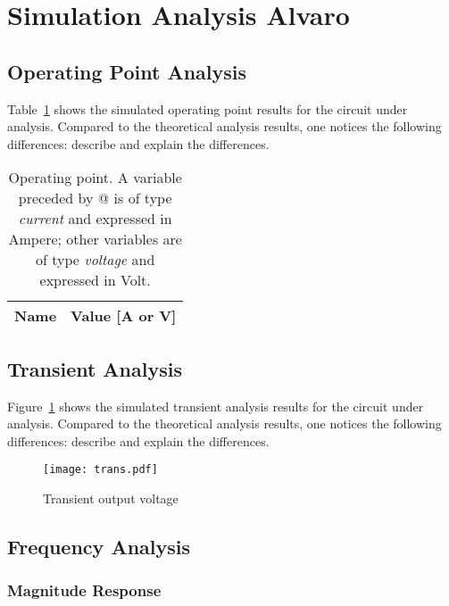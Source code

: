 \section{Simulation Analysis Alvaro}
\label{sec:simulation}

\subsection{Operating Point Analysis}

Table~\ref{tab:op} shows the simulated operating point results for the circuit
under analysis. Compared to the theoretical analysis results, one notices the
following differences: describe and explain the differences.

\begin{table}[h]
  \centering
  \begin{tabular}{|l|r|}
    \hline    
    {\bf Name} & {\bf Value [A or V]} \\ \hline
    
  \end{tabular}
  \caption{Operating point. A variable preceded by @ is of type {\em current}
    and expressed in Ampere; other variables are of type {\it voltage} and expressed in
    Volt.}
  \label{tab:op}
\end{table}

\lipsum[1-1]


\subsection{Transient Analysis}

Figure~\ref{fig:trans} shows the simulated transient analysis results for the
circuit under analysis. Compared to the theoretical analysis results, one
notices the following differences: describe and explain the differences.

\begin{figure}[h] \centering
\texttt{[image: trans.pdf]}
\caption{Transient output voltage}
\label{fig:trans}
\end{figure}

\lipsum[1-1]



\subsection{Frequency Analysis}

\subsubsection{Magnitude Response}

